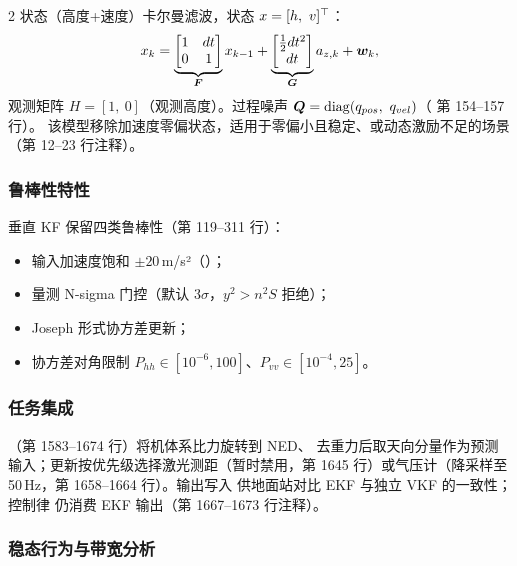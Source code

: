 2 状态（高度+速度）卡尔曼滤波，状态 $x = [h,\ v]^{\top}$：
\begin{equation}
  x_k = \underbrace{\begin{bmatrix} 1 & dt \\ 0 & 1 \end{bmatrix}}_{\boldsymbol{F}}
    x_{k-1} + \underbrace{\begin{bmatrix} \tfrac12 dt^2 \\ dt \end{bmatrix}}_{\boldsymbol{G}}
    a_{z,k} + \boldsymbol{w}_k,
  \label{eq:vkf-model}
\end{equation}
观测矩阵 $H = [1,\ 0]$（观测高度）。过程噪声
$\boldsymbol{Q} = \operatorname{diag}(q_{pos},\ q_{vel})$（ 第 154--157 行）。
该模型移除加速度零偏状态，适用于零偏小且稳定、或动态激励不足的场景
（第 12--23 行注释）。

\subsubsection{鲁棒性特性}

垂直 KF 保留四类鲁棒性（第 119--311 行）：
\begin{itemize}
  \item 输入加速度饱和 $\pm20$\,m/s²（）；
  \item 量测 N-sigma 门控（默认 3$\sigma$，$y^2 > n^2 S$ 拒绝）；
  \item Joseph 形式协方差更新；
  \item 协方差对角限制 $P_{hh}\in[10^{-6}, 100]$、$P_{vv}\in[10^{-4}, 25]$。
\end{itemize}

\subsubsection{任务集成}

（第 1583--1674 行）将机体系比力旋转到 NED、
去重力后取天向分量作为预测输入；更新按优先级选择激光测距（暂时禁用，第
1645 行）或气压计（降采样至 50\,Hz，第 1658--1664 行）。输出写入
 供地面站对比 EKF 与独立 VKF 的一致性；控制律
仍消费 EKF 输出（第 1667--1673 行注释）。

\subsubsection{稳态行为与带宽分析}

